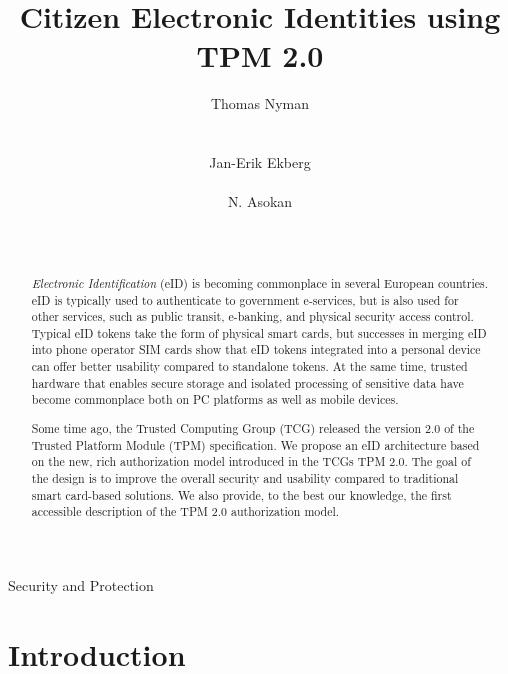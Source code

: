 \documentclass{sig-alternate-2013}
\begin{document}
\title{Citizen Electronic Identities using TPM 2.0}

\ifx\isanonymous\undefined
{}
\author{
\alignauthor Thomas Nyman\\
  \\
  \\
\alignauthor Jan-Erik Ekberg\\
  \\
\alignauthor N. Asokan\\
  \\
  \\
}
\fi

\maketitle
\begin{abstract}
\emph{Electronic Identification} (eID) is becoming commonplace in several
European countries. eID is typically used to authenticate to government
e-services, but is also used for other services, such as public transit,
e-banking, and physical security access control. Typical eID tokens take the
form of physical smart cards, but successes in merging eID into phone operator
SIM cards show that eID tokens integrated into a personal device can offer
better usability compared to standalone tokens. At the same time, trusted
hardware that enables secure storage and isolated processing of sensitive data
have become commonplace both on PC platforms as well as mobile devices.

Some time ago, the Trusted Computing Group (TCG) released the version 2.0 of the
Trusted Platform Module (TPM) specification. We propose an eID architecture
based on the new, rich authorization model introduced in the TCGs TPM 2.0. The
goal of the design is to improve the overall security and usability compared to
traditional smart card-based solutions. We also provide, to the best our
knowledge, the first accessible description of the TPM 2.0 authorization model.
\end{abstract}

  {Security and Protection}

\section{Introduction}
\label{sec:introduction}
\end{document}
